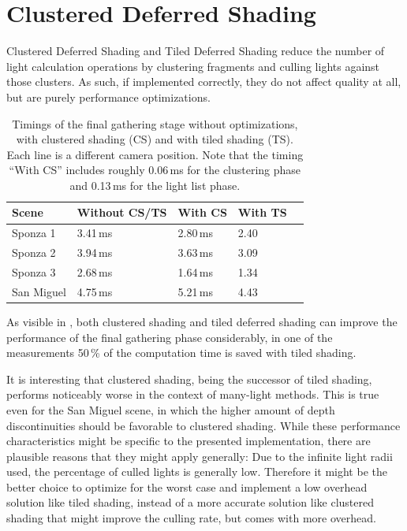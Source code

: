 



\section{Clustered Deferred Shading}
\label{sec:results:clusteredShading}

Clustered Deferred Shading and Tiled Deferred Shading reduce the number of light calculation operations by clustering fragments and culling lights against those clusters. As such, if implemented correctly, they do not affect quality at all, but are purely performance optimizations.

\begin{table}[h]
    \begin{center}
        \begin{tabulary}{0.98\textwidth}{| L | L | L | L | L |}
            \hline
            Scene & Without CS/TS & With CS & With TS \\ \hline
            Sponza 1 & 3.41\,ms & 2.80\,ms & 2.40\\
            Sponza 2 & 3.94\,ms & 3.63\,ms & 3.09\\
            Sponza 3 & 2.68\,ms & 1.64\,ms & 1.34\\
            San Miguel & 4.75\,ms & 5.21\,ms & 4.43\\
            \hline
        \end{tabulary}
        \caption{Timings of the final gathering stage without optimizations, with clustered shading (CS) and with tiled shading (TS). Each line is a different camera position. Note that the timing ``With CS'' includes roughly 0.06\,ms for the clustering phase and 0.13\,ms for the light list phase.}
        \label{tab:results:timings_clustered_shading}
    \end{center}
\end{table}

As visible in , both clustered shading and tiled deferred shading can improve the performance of the final gathering phase considerably, in one of the measurements 50\,\% of the computation time is saved with tiled shading.


It is interesting that clustered shading, being the successor of tiled shading, performs noticeably worse in the context of many-light methods. This is true even for the San Miguel scene, in which the higher amount of depth discontinuities should be favorable to clustered shading. While these performance characteristics might be specific to the presented implementation, there are plausible reasons that they might apply generally: Due to the infinite light radii used, the percentage of culled lights is generally low. Therefore it might be the better choice to optimize for the worst case and implement a low overhead solution like tiled shading, instead of a more accurate solution like clustered shading that might improve the culling rate, but comes with more overhead.

